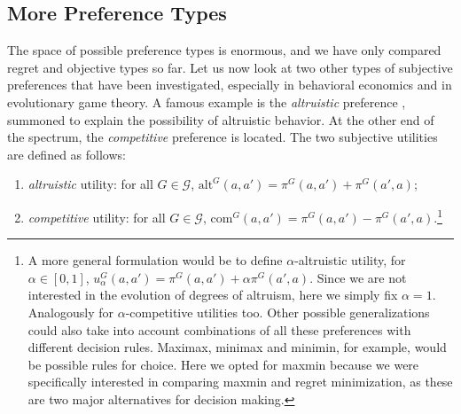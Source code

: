 \documentclass[fleqn,reqno,12pt]{article}
\theoremstyle{Satz}
\theoremstyle{Bsp}
\begin{document}
\subsection{More Preference Types}
\label{sec:more-types}

The space of possible preference types is enormous, and we have only compared regret
and objective types so far. Let us now
look at two other types of subjective preferences that have been investigated, especially
in behavioral economics and in evolutionary game theory. A famous example is the
\textit{altruistic} preference \citep[e.g.,][]{Beck76,BestGuth98}, summoned to explain the
possibility of altruistic behavior. At the other end of the spectrum, the \emph{competitive}
preference is located. The two subjective utilities are defined as follows:
\begin{enumerate}
\item \textit{altruistic} utility: for all $G \in \mathcal{G}$, $\text{alt}^G(a,a') = \pi^G(a,a') + \pi^G(a',a)$;
\item \textit{competitive} utility: for all $G \in \mathcal{G}$, $\text{com}^G(a,a') = \pi^G(a,a') - \pi^G(a',a)$.\footnote{A
    more general formulation would be to define $ \alpha$-altruistic utility, for
    $\alpha \in [0,1]$,
    $ u^G_\alpha(a, a')=\pi^G(a,a') + \alpha \pi^G(a',a)$. Since we are not
    interested in the evolution of degrees of altruism, here we simply fix $ \alpha = 1 $. Analogously for $\alpha$-competitive utilities too. Other possible generalizations could also take into account combinations of all these preferences with different decision rules. Maximax, minimax and minimin, for example, would be possible rules for choice. Here we opted for maxmin because we were specifically interested in comparing maxmin and regret minimization, as these are two major alternatives for decision making.}
\end{enumerate}
\end{document}

